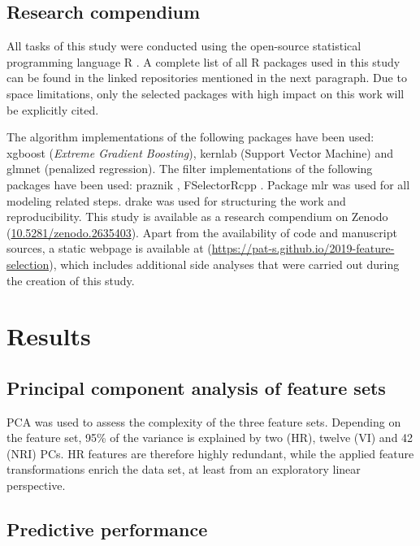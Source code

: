 \documentclass[remotesensing,article,submit,moreauthors,pdftex]{Definitions/mdpi}
\begin{document}
\subsection{Research compendium}

All tasks of this study were conducted using the open-source statistical programming language R \cite{rcoreteam2019}.
A complete list of all R packages used in this study can be found in the linked repositories mentioned in the next paragraph.
Due to space limitations, only the selected packages with high impact on this work will be explicitly cited.

The algorithm implementations of the following packages have been used: xgboost \cite{chen2016} (\textit{Extreme Gradient Boosting}), kernlab \cite{kernlab} (Support Vector Machine) and glmnet \cite{glmnet} (penalized regression).
The filter implementations of the following packages have been used: praznik \cite{praznik}, FSelectorRcpp \cite{fselectorrcpp}.
Package mlr \cite{mlr} was used for all modeling related steps.
drake \cite{drake} was used for structuring the work and reproducibility.
This study is available as a research compendium on Zenodo (\url{10.5281/zenodo.2635403}).
Apart from the availability of code and manuscript sources, a static webpage is available at (\url{https://pat-s.github.io/2019-feature-selection}), which includes additional side analyses that were carried out during the creation of this study.

\section{Results}

\subsection{Principal component analysis of feature sets}

PCA was used to assess the complexity of the three feature sets.
Depending on the feature set, 95\% of the variance is explained by two (HR), twelve (VI) and 42 (NRI) \ac{PC}s.
HR features are therefore highly redundant, while the applied feature transformations enrich the data set, at least from an exploratory linear perspective.

\subsection{Predictive performance}
\end{document}
